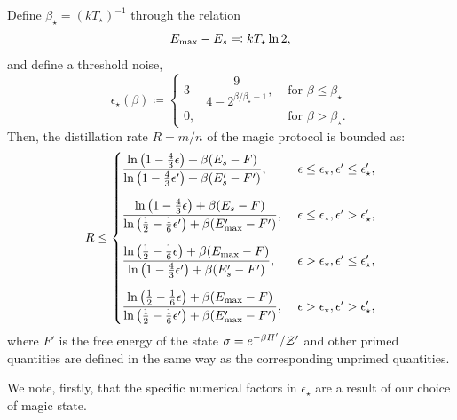 \begin{theorem}
Define $\beta_\star = (k T_\star)^{-1}$ through the relation
\begin{equation}
	E_{\rm max} - E_s \eqqcolon kT_\star \ln 2,
\end{equation}
and define a threshold noise,
\begin{equation}
	\epsilon_{\star}(\beta) \coloneqq 
	\begin{cases}
		3 - \dfrac{9}{4-2^{\beta/\beta_\star - 1}}, &\text{ for } \beta \leq \beta_\star \\
		0, &\text{ for } \beta > \beta_\star.
	\end{cases}
\end{equation}
Then, the distillation rate $R = m/n$ of the magic protocol is bounded as:
\begin{equation}\label{eq:rate_bounds_proof}
	R \leq
	\begin{cases}
		\dfrac{\ln{\big( 1-\frac{4}{3}\epsilon \big)} + \beta (E_s - F)}{\ln{\big( 1-\frac{4}{3}\epsilon' \big)} + \beta (E'_s - F')},\ &\epsilon \leq \epsilon_\star, \epsilon' \leq \epsilon'_\star, \vspace{10pt}\\
		\dfrac{\ln{\big( 1-\frac{4}{3}\epsilon \big)} + \beta (E_s - F)}{\ln{\big( \frac{1}{2}-\frac{1}{6}\epsilon' \big)} + \beta (E'_{\rm{max}} - F')},\ &\epsilon \leq \epsilon_\star, \epsilon' > \epsilon'_\star, \vspace{10pt}\\
		\dfrac{\ln{\big( \frac{1}{2}-\frac{1}{6}\epsilon \big)} + \beta (E_{\rm{max}} - F)}{\ln{\big( 1-\frac{4}{3}\epsilon' \big)} + \beta (E'_s - F')},\ &\epsilon > \epsilon_\star, \epsilon' \leq \epsilon'_\star, \vspace{10pt}\\
		\dfrac{\ln{\big( \frac{1}{2}-\frac{1}{6}\epsilon \big)} + \beta (E_{\rm{max}} - F)}{\ln{\big( \frac{1}{2}-\frac{1}{6}\epsilon' \big)} + \beta (E'_{\rm{max}} - F')},\ &\epsilon > \epsilon_\star, \epsilon' > \epsilon'_\star,
	\end{cases}
\end{equation}
where $F'$ is the free energy of the state $\sigma = e^{-\beta H'}/\mathcal{Z}'$ and other primed quantities are defined in the same way as the corresponding unprimed quantities. 
\end{theorem}
We note, firstly, that the specific numerical factors in $\epsilon_\star$ are a result of our choice of magic state. 
